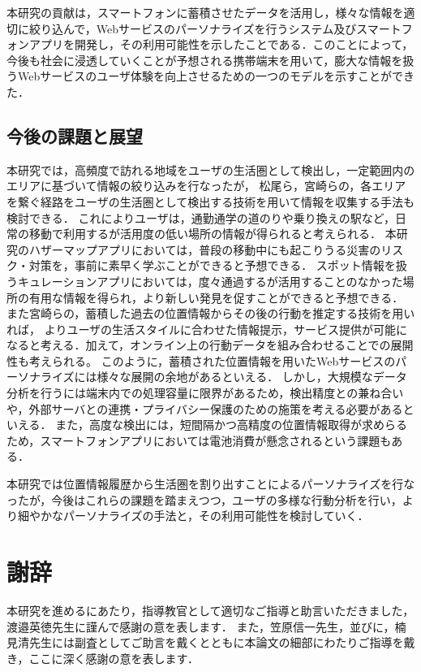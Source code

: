 \documentclass[a4paper]{jsarticle}
\begin{document}
\begin{enumerate}
\begin{enumerate}
本研究の貢献は，スマートフォンに蓄積させたデータを活用し，様々な情報を適切に絞り込んで，Webサービスのパーソナライズを行うシステム及びスマートフォンアプリを開発し，その利用可能性を示したことである．このことによって，今後も社会に浸透していくことが予想される携帯端末を用いて，膨大な情報を扱うWebサービスのユーザ体験を向上させるための一つのモデルを示すことができた．


\subsection{今後の課題と展望}
本研究では，高頻度で訪れる地域をユーザの生活圏として検出し，一定範囲内のエリアに基づいて情報の絞り込みを行なったが，
松尾ら，宮崎らの，各エリアを繋ぐ経路をユーザの生活圏として検出する技術\cite{matsuo}\cite{docomo}を用いて情報を収集する手法も検討できる．
これによりユーザは，通勤通学の道のりや乗り換えの駅など，日常の移動で利用するが活用度の低い場所の情報が得られると考えられる．
本研究のハザーマップアプリにおいては，普段の移動中にも起こりうる災害のリスク・対策を，事前に素早く学ぶことができると予想できる．
スポット情報を扱うキュレーションアプリにおいては，度々通過するが活用することのなかった場所の有用な情報を得られ，より新しい発見を促すことができると予想できる．
また宮崎らの，蓄積した過去の位置情報からその後の行動を推定する技術\cite{docomo}を用いれば，
よりユーザの生活スタイルに合わせた情報提示，サービス提供が可能になると考える．加えて，オンライン上の行動データを組み合わせることでの展開性も考えられる。
このように，蓄積された位置情報を用いたWebサービスのパーソナライズには様々な展開の余地があるといえる．
しかし，大規模なデータ分析を行うには端末内での処理容量に限界があるため，検出精度との兼ね合いや，外部サーバとの連携・プライバシー保護のための施策を考える必要があるといえる．
また，高度な検出には，短間隔かつ高精度の位置情報取得が求めらるため，スマートフォンアプリにおいては電池消費が懸念されるという課題もある．

本研究では位置情報履歴から生活圏を割り出すことによるパーソナライズを行なったが，今後はこれらの課題を踏まえつつ，ユーザの多様な行動分析を行い，より細やかなパーソナライズの手法と，その利用可能性を検討していく．

\newpage
\section*{謝辞}
本研究を進めるにあたり，指導教官として適切なご指導と助言いただきました，渡邉英徳先生に謹んで感謝の意を表します．
また，笠原信一先生，並びに，楠見清先生には副査としてご助言を戴くとともに本論文の細部にわたりご指導を戴き，ここに深く感謝の意を表します．


\end{enumerate}
\end{enumerate}
\end{document}
